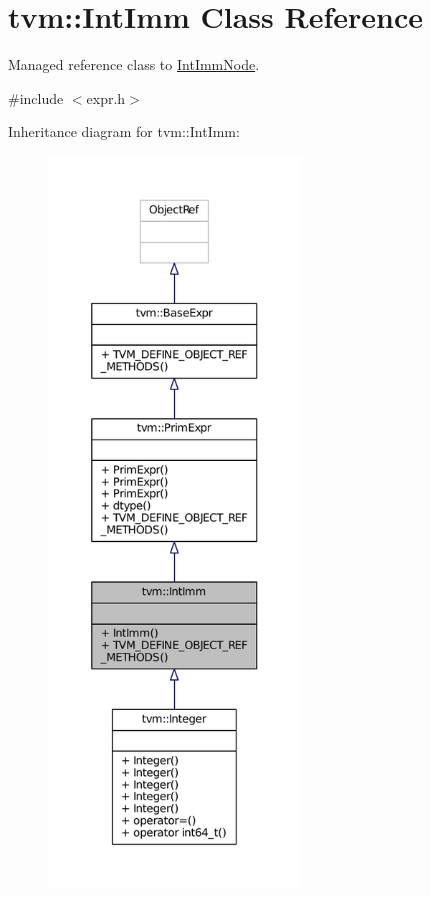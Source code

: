 \hypertarget{classtvm_1_1IntImm}{}\section{tvm\+:\+:Int\+Imm Class Reference}
\label{classtvm_1_1IntImm}


Managed reference class to \hyperlink{classtvm_1_1IntImmNode}{Int\+Imm\+Node}.  




{\ttfamily \#include $<$expr.\+h$>$}



Inheritance diagram for tvm\+:\+:Int\+Imm\+:
\nopagebreak
\begin{figure}[H]
\begin{center}
\leavevmode
\includegraphics[height=550pt]{classtvm_1_1IntImm__inherit__graph}
\end{center}
\end{figure}


